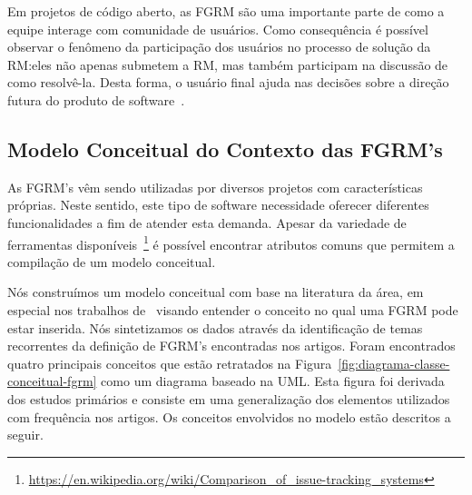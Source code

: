 Em projetos de código aberto, as FGRM são uma importante parte de como a equipe
interage com comunidade de usuários. Como consequência é possível observar o
fenômeno da participação dos usuários no processo de solução da RM:\@ eles não
apenas submetem a RM, mas também participam na discussão de como resolvê-la.
Desta forma, o usuário final ajuda nas decisões sobre a direção futura do
produto de software~\cite{breu2010information}.

\subsection{Modelo Conceitual do Contexto das FGRM's}
\label{sub:espectro_funcionalidades_fgrm}

As FGRM's vêm sendo utilizadas por diversos projetos com características
próprias. Neste sentido, este tipo de software necessidade oferecer diferentes
funcionalidades a fim de atender esta demanda. Apesar da variedade de
ferramentas
disponíveis~\footnote{\url{https://en.wikipedia.org/wiki/Comparison_of_issue-tracking_systems}}
é possível encontrar atributos comuns que permitem a compilação de um modelo
conceitual.

Nós construímos um modelo conceitual com base na literatura da área, em especial
nos trabalhos de~\cite{cavalcanti2014challenges, singh2011bug,
	kshirsagar2015issue} visando entender o conceito no qual uma FGRM pode estar
inserida. Nós sintetizamos os dados através da identificação de temas
recorrentes da definição de FGRM's encontradas nos artigos. Foram encontrados
quatro principais conceitos que estão retratados na
Figura~\ref{fig:diagrama-classe-conceitual-fgrm} como um diagrama baseado na
UML. Esta figura foi derivada dos estudos primários e consiste em uma
generalização dos elementos utilizados com frequência nos artigos. Os conceitos
envolvidos no modelo estão descritos a seguir.

